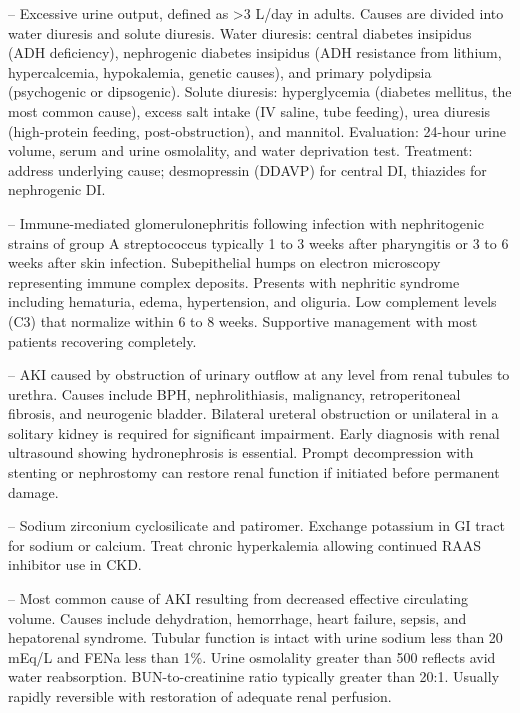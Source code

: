 -- Excessive urine output, defined as >3 L/day in adults. Causes are divided into water diuresis and solute diuresis. Water diuresis: central diabetes insipidus (ADH deficiency), nephrogenic diabetes insipidus (ADH resistance from lithium, hypercalcemia, hypokalemia, genetic causes), and primary polydipsia (psychogenic or dipsogenic). Solute diuresis: hyperglycemia (diabetes mellitus, the most common cause), excess salt intake (IV saline, tube feeding), urea diuresis (high-protein feeding, post-obstruction), and mannitol. Evaluation: 24-hour urine volume, serum and urine osmolality, and water deprivation test. Treatment: address underlying cause; desmopressin (DDAVP) for central DI, thiazides for nephrogenic DI.

-- Immune-mediated glomerulonephritis following infection with nephritogenic strains of group A streptococcus typically 1 to 3 weeks after pharyngitis or 3 to 6 weeks after skin infection. Subepithelial humps on electron microscopy representing immune complex deposits. Presents with nephritic syndrome including hematuria, edema, hypertension, and oliguria. Low complement levels (C3) that normalize within 6 to 8 weeks. Supportive management with most patients recovering completely.

-- AKI caused by obstruction of urinary outflow at any level from renal tubules to urethra. Causes include BPH, nephrolithiasis, malignancy, retroperitoneal fibrosis, and neurogenic bladder. Bilateral ureteral obstruction or unilateral in a solitary kidney is required for significant impairment. Early diagnosis with renal ultrasound showing hydronephrosis is essential. Prompt decompression with stenting or nephrostomy can restore renal function if initiated before permanent damage.

-- Sodium zirconium cyclosilicate and patiromer. Exchange potassium in GI tract for sodium or calcium. Treat chronic hyperkalemia allowing continued RAAS inhibitor use in CKD.

-- Most common cause of AKI resulting from decreased effective circulating volume. Causes include dehydration, hemorrhage, heart failure, sepsis, and hepatorenal syndrome. Tubular function is intact with urine sodium less than 20 mEq/L and FENa less than 1\%. Urine osmolality greater than 500 reflects avid water reabsorption. BUN-to-creatinine ratio typically greater than 20:1. Usually rapidly reversible with restoration of adequate renal perfusion.


